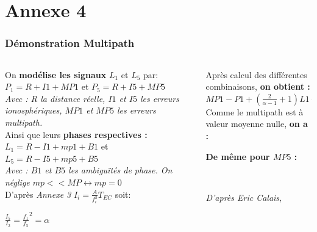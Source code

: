 \documentclass[xcolor=dvipsnames,envcountsect]{beamer}
\begin{document}
\section{Annexe 4}
\begin{frame}
	\label{appendix:4}
	\frametitle{Démonstration Multipath}

	\begin{columns}
		\begin{column}{0.5\textwidth}
			{\small
			On \textbf{modélise les signaux} $L_1$ et $L_5$ par: \\
			$P_1 = R +I1 +MP1$ et $P_5 = R + I5 + MP5$ \\
			\textit{Avec : $R$ la distance réelle, $I1$ et $I5$ les erreurs ionosphériques, $MP1$ et $MP5$ les erreurs multipath.} \\
			Ainsi que leurs \textbf{phases respectives :} \\
			$L_1 = R - I1 + mp1 + B1$ et $L_5 = R - I5 + mp5 + B5$ \\
			\textit{Avec : $B1$ et $B5$ les ambiguïtés de phase. On néglige $mp << MP \leftrightarrow mp=0$} \\
			D'après \textit{Annexe 3} $I_i = \frac{A}{f_i^2}T_{EC}$ soit: 
			\begin{center}
				$\frac{I_5}{I_2} = \frac{f_1}{f_5}^2 = \alpha$
			\end{center}
			}
		\end{column}

		\begin{column}{0.5\textwidth}
			Après calcul des différentes combinaisons, \textbf{on obtient :} \\
			{\small $MP1 - P1 + (\frac{2}{\alpha - 1} + 1)L1 - (\frac{2}{\alpha - 1}) L5 = cte$} \\
			Comme le multipath est à valeur moyenne nulle, \textbf{on a :} \newline

			{\footnotesize {}} \newline

			\textbf{De même pour $MP5$ :} \newline
			
			{\footnotesize {}} \\

			\begin{flushright}
				{\tiny \textit{D'après Eric Calais, \cite{ens}}}
			\end{flushright}
		\end{column}
	\end{columns}
\end{frame}
\end{document}

